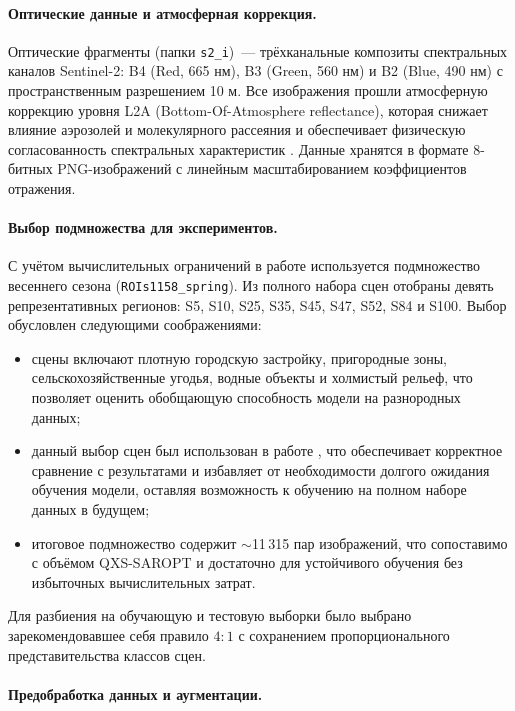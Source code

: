 \paragraph{Оптические данные и атмосферная коррекция.}
Оптические фрагменты (папки \texttt{s2\_i})~--- трёхканальные композиты спектральных каналов Sentinel-2: B4 (Red, 665 нм), B3 (Green, 560 нм) и B2 (Blue, 490 нм) с пространственным разрешением 10 м.
Все изображения прошли атмосферную коррекцию уровня L2A (Bottom-Of-Atmosphere reflectance), которая снижает влияние аэрозолей и молекулярного рассеяния и обеспечивает физическую согласованность спектральных характеристик \cite{schmitt2018sen1}.
Данные хранятся в формате 8-битных PNG-изображений с линейным масштабированием коэффициентов отражения.

\paragraph{Выбор подмножества для экспериментов.}
С учётом вычислительных ограничений в работе используется подмножество весеннего сезона (\texttt{ROIs1158\_spring}).
Из полного набора сцен отобраны девять репрезентативных регионов: S5, S10, S25, S35, S45, S47, S52, S84 и S100.
Выбор обусловлен следующими соображениями:
\begin{itemize}
    \item сцены включают плотную городскую застройку, пригородные зоны, сельскохозяйственные угодья, водные объекты и холмистый рельеф, что позволяет оценить обобщающую способность модели на разнородных данных;
    \item данный выбор сцен был использован в работе \cite{wei2023cfrwd}, что обеспечивает корректное сравнение с результатами и избавляет от необходимости долгого ожидания обучения модели, оставляя возможность к обучению на полном наборе данных в будущем;
    \item итоговое подмножество содержит $\sim$11\,315 пар изображений, что сопоставимо с объёмом QXS-SAROPT \cite{huang2021qxs} и достаточно для устойчивого обучения без избыточных вычислительных затрат.
\end{itemize}

Для разбиения на обучающую и тестовую выборки было выбрано зарекомендовавшее себя правило $4:1$ с сохранением пропорционального представительства классов сцен.

\paragraph{Предобработка данных и аугментации.}
\label{par:preprocessing_augmentations}

